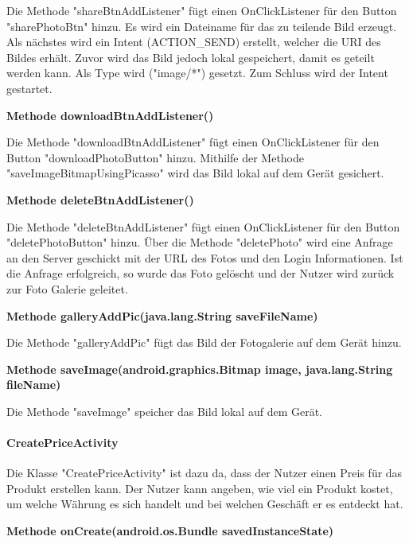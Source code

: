 \documentclass{scrartcl}
\begin{document}
\noindent Die Methode "shareBtnAddListener" fügt einen OnClickListener für den Button "sharePhotoBtn" hinzu. Es wird ein Dateiname für das zu teilende Bild erzeugt. Als nächstes wird ein Intent (ACTION\_SEND) erstellt, welcher die URI des Bildes erhält. Zuvor wird das Bild jedoch lokal gespeichert, damit es geteilt werden kann. Als Type wird ("image/*") gesetzt. Zum Schluss wird der Intent gestartet. \newline 

\noindent\textbf{Methode downloadBtnAddListener()}

\noindent Die Methode "downloadBtnAddListener" fügt einen OnClickListener für den Button "downloadPhotoButton" hinzu. Mithilfe der Methode "saveImageBitmapUsingPicasso" wird das Bild lokal auf dem Gerät gesichert. \newline 

\noindent\textbf{Methode deleteBtnAddListener()}

\noindent Die Methode "deleteBtnAddListener" fügt einen OnClickListener für den Button "deletePhotoButton" hinzu. Über die Methode "deletePhoto" wird eine Anfrage an den Server geschickt mit der URL des Fotos und den Login Informationen. Ist die Anfrage erfolgreich, so wurde das Foto gelöscht und der Nutzer wird zurück zur Foto Galerie geleitet. \newline

\noindent\textbf{Methode galleryAddPic(java.lang.String saveFileName)}

\noindent Die Methode "galleryAddPic" fügt das Bild der Fotogalerie auf dem Gerät hinzu. \newline

\noindent\textbf{Methode saveImage(android.graphics.Bitmap image, java.lang.String fileName)}

\noindent Die Methode "saveImage" speicher das Bild lokal auf dem Gerät. \newline

\newpage

\paragraph{CreatePriceActivity}
Die Klasse "CreatePriceActivity" ist dazu da, dass der Nutzer einen Preis für das Produkt erstellen kann. Der Nutzer kann angeben, wie viel ein Produkt kostet, um welche Währung es sich handelt und bei welchen Geschäft er es entdeckt hat. \newline 

\noindent\textbf{Methode onCreate(android.os.Bundle savedInstanceState)}
\end{document}

